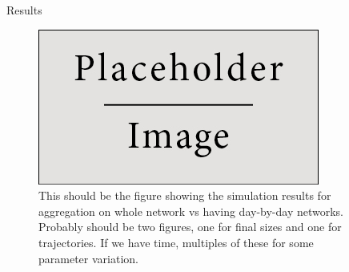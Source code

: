 \documentclass[final]{beamer} %
\newcommand{\spacer}{\begin{column}{0.02\paperwidth}\end{column}}
\begin{document}
\begin{frame}{}
\begin{columns}[t]
\begin{column}{0.6\paperwidth}
\begin{block}{Results}
\begin{figure}
    \end{figure}
    \begin{figure}
    \includegraphics[width=0.8\linewidth]{placeholder.jpg}
    \caption{This should be the figure showing the simulation results for aggregation on whole network vs having day-by-day networks.  Probably should be two figures, one for final sizes and one for trajectories.  If we have time, multiples of these for some parameter variation.}
    \end{figure}
    
    \end{block}
    \vfill
    \end{column}
    \spacer{}
    \end{columns}
  \end{frame}
  
\end{document}
